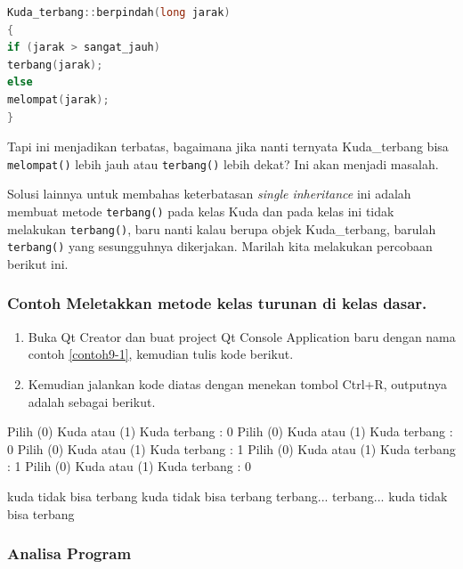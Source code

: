 \begin{lstlisting}[language=c++, numbers=none]
Kuda_terbang::berpindah(long jarak)
{
if (jarak > sangat_jauh)
terbang(jarak);
else
melompat(jarak);
}
\end{lstlisting}

Tapi ini menjadikan terbatas, bagaimana jika nanti ternyata
Kuda\_terbang bisa \texttt{melompat()} lebih jauh atau
\texttt{terbang()} lebih dekat? Ini akan menjadi masalah.

Solusi lainnya untuk membahas keterbatasan \emph{single inheritance} ini
adalah membuat metode \texttt{terbang()} pada kelas Kuda dan pada kelas
ini tidak melakukan \texttt{terbang()}, baru nanti kalau berupa objek
Kuda\_terbang, barulah \texttt{terbang()} yang sesungguhnya dikerjakan.
Marilah kita melakukan percobaan berikut ini.

\subsubsection*{Contoh  Meletakkan metode kelas turunan di kelas dasar.}

\begin{enumerate}

\item
  Buka Qt Creator dan buat project Qt Console Application baru dengan
  nama contoh \ref{contoh9-1}, kemudian tulis kode berikut.




\item
  Kemudian jalankan kode diatas dengan menekan tombol Ctrl+R, outputnya
  adalah sebagai berikut.
\end{enumerate}

\begin{lcverbatim}
Pilih (0) Kuda atau (1) Kuda terbang : 0
Pilih (0) Kuda atau (1) Kuda terbang : 0
Pilih (0) Kuda atau (1) Kuda terbang : 1
Pilih (0) Kuda atau (1) Kuda terbang : 1
Pilih (0) Kuda atau (1) Kuda terbang : 0

kuda tidak bisa terbang
kuda tidak bisa terbang
terbang...
terbang...
kuda tidak bisa terbang
\end{lcverbatim}

\subsubsection*{Analisa Program}

